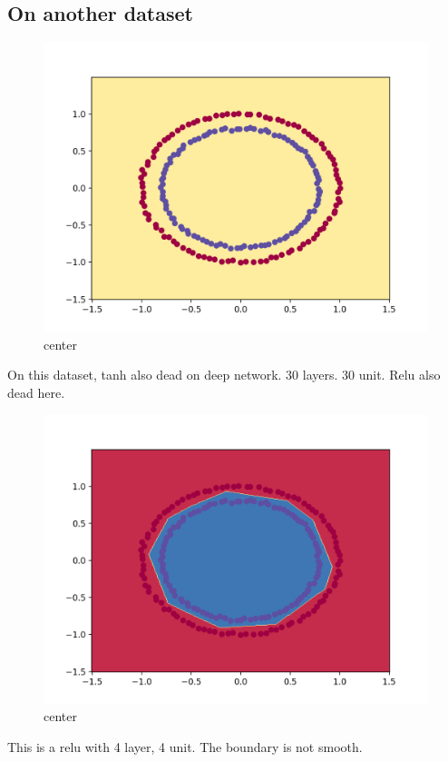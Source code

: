 \documentclass[12pt]{article}
\begin{document}
\subsection{On another dataset}
\begin{figure}[H]
  \caption{center}
  \centering
    \includegraphics[scale=0.2]{tandead.png}
\end{figure}
On this dataset, tanh also dead on deep network. 30 layers. 30 unit.
Relu also dead here.
\begin{figure}[H]
  \caption{center}
  \centering
    \includegraphics[scale=0.2]{4layer6relu.png}
\end{figure}
This is a relu with 4 layer, 4 unit. The boundary is not smooth. 
\end{document}
